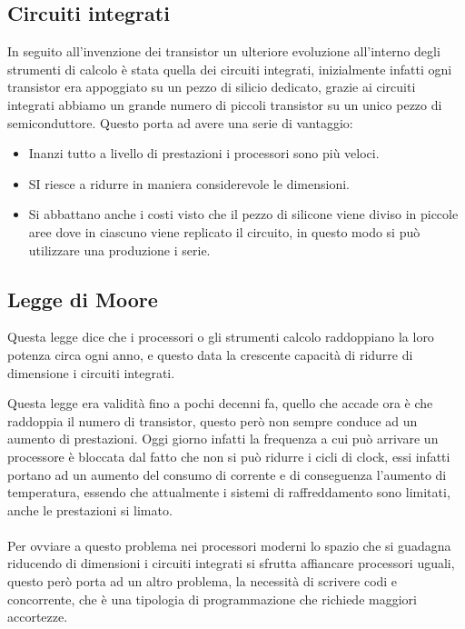 \subsection{Circuiti integrati}
In seguito all'invenzione dei transistor un ulteriore evoluzione all'interno degli strumenti di calcolo è stata quella dei circuiti integrati, inizialmente infatti ogni transistor era appoggiato su un pezzo di silicio dedicato, grazie ai circuiti integrati abbiamo un grande numero di piccoli transistor su un unico pezzo di semiconduttore. Questo porta ad avere una serie di vantaggio:
\begin{itemize}
    \item Inanzi tutto a livello di prestazioni i processori sono più veloci.
    \item SI riesce a ridurre in maniera considerevole le dimensioni.
    \item Si abbattano anche i costi visto che il pezzo di silicone viene diviso in piccole aree dove in ciascuno viene replicato il circuito, in questo modo si può utilizzare una produzione i serie.
\end{itemize}

\subsection{Legge di Moore}
\begin{definition}
Questa legge dice che i processori o gli strumenti calcolo raddoppiano la loro potenza circa ogni anno, e questo data la crescente capacità di ridurre di dimensione i circuiti integrati.
\end{definition}

\hspace{-15pt}Questa legge era validità fino a pochi decenni fa, quello che accade ora è che raddoppia il numero di transistor, questo però non sempre conduce ad un aumento di prestazioni. Oggi giorno infatti la frequenza a cui può arrivare un processore è bloccata dal fatto che non si può ridurre i cicli di clock, essi infatti portano ad un aumento del consumo di corrente e di conseguenza l'aumento di temperatura, essendo che attualmente i sistemi di raffreddamento sono limitati, anche le prestazioni si limato.\\\\
Per ovviare a questo problema nei processori moderni lo spazio che si guadagna riducendo di dimensioni i circuiti integrati si sfrutta affiancare processori uguali, questo però porta ad un altro problema, la necessità di scrivere codi e concorrente, che è una tipologia di programmazione che richiede maggiori accortezze.


